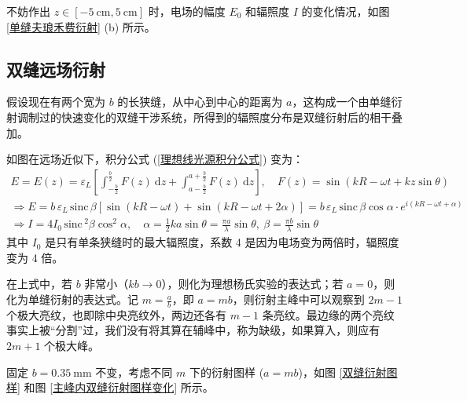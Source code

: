 \documentclass[UTF8]{report}
\def\sinc{\mathrm{\,sinc}\,}
\theoremstyle{MyLineTheoremStyle} %
\theoremstyle{MyBlockTheoremStyle} %
\theoremstyle{MySubsubsectionStyle} %
\begin{document}
不妨作出 $z \in [-5 \ \mathrm{cm}, 5 \ \mathrm{cm}]$ 时，电场的幅度 $E_0$ 和辐照度 $I$ 的变化情况，如图 \ref{单缝夫琅禾费衍射} (b) 所示。


\subsection{双缝远场衍射}

假设现在有两个宽为 $b$ 的长狭缝，从中心到中心的距离为 $a$，这构成一个由单缝衍射调制过的快速变化的双缝干涉系统，所得到的辐照度分布是双缝衍射后的相干叠加。

如图在远场近似下，积分公式 (\ref{理想线光源积分公式}) 变为：
\begin{gather}
E  = E(z)= \varepsilon_L \left[\int_{-\frac{b}{2}}^{\frac{b}{2}} F(z) \ \mathrm{d}z + \int_{a-\frac{b}{2}}^{a+\frac{b}{2}} F(z) \ \mathrm{d}z\right]
,\quad F(z) = \sin \left(kR - \omega t + kz \sin \theta\right) \\ 
\Longrightarrow E = b\,\varepsilon_L \sinc \beta \left[\sin (kR - \omega t) + \sin (kR - \omega t + 2\alpha)\right] = b\,\varepsilon_L \sinc \beta \cos \alpha \cdot e^{i(kR - \omega t + \alpha)} \\ 
\Longrightarrow I = 4 I_0 \sinc^2 \beta \cos^2 \alpha,\quad \alpha = \frac{1}{2}k a \sin \theta = \frac{\pi a}{\lambda} \sin \theta,\ \beta = \frac{\pi b}{\lambda} \sin \theta
\end{gather}
其中 $I_0$ 是只有单条狭缝时的最大辐照度，系数 4 是因为电场变为两倍时，辐照度变为 4 倍。

在上式中，若 $b$ 非常小（$kb \to 0$），则化为理想杨氏实验的表达式；若 $a = 0$，则化为单缝衍射的表达式。记 $m = \frac{a}{b}$，即 $a = mb$，则衍射主峰中可以观察到 $2m-1$ 个极大亮纹，也即除中央亮纹外，两边还各有 $m-1$ 条亮纹。最边缘的两个亮纹事实上被“分割”过，我们没有将其算在辅峰中，称为缺级，如果算入，则应有 $2m + 1$ 个极大峰。



固定 $b = 0.35 \ \mathrm{mm}$ 不变，考虑不同 $m$ 下的衍射图样 ($a = mb$)，如图 \ref{双缝衍射图样} 和图 \ref{主峰内双缝衍射图样变化} 所示。
\end{document}
